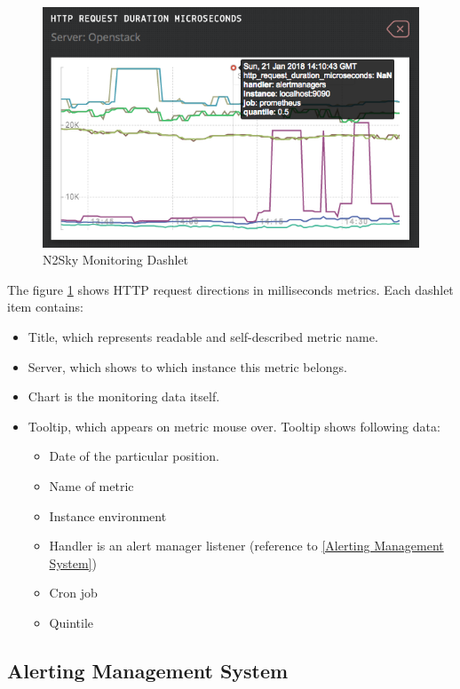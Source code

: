  
\begin{figure}[htbp]
\begin{center}
  \includegraphics[scale=0.65]{components/3/components/monitoring_dashlet.png}
  \caption{N2Sky Monitoring Dashlet}
  \label{fig:monitoring_dashlet}
\end{center}
\end{figure}

 
The figure \ref{fig:monitoring_dashlet}  shows HTTP request directions in milliseconds metrics. Each dashlet item contains:
\begin{itemize}
\item Title, which represents readable and self-described metric name.
\item Server, which shows to which instance this metric belongs.
\item Chart is the monitoring data itself. 
\item Tooltip, which appears on metric mouse over. Tooltip shows following data:
\begin{itemize}
\item Date of the particular position.
\item Name of metric
\item Instance environment 
\item Handler is an alert manager listener (reference to \autoref{Alerting Management System})
\item Cron job
\item Quintile 
\end{itemize}

\end{itemize}


\subsection{Alerting Management System}\label{Alerting Management System}

